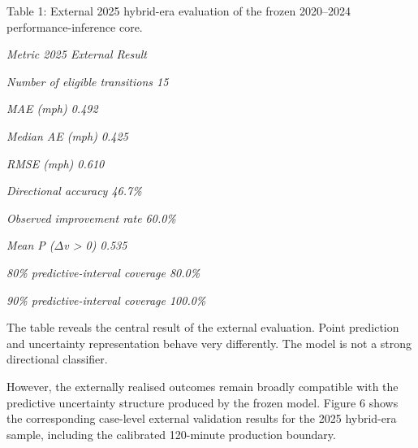 Table 1: External 2025 hybrid-era evaluation of the frozen 2020--2024 performance-inference core.

\begin{center}\textit{Metric                               2025 External Result}\end{center}

\begin{center}\textit{Number of eligible transitions                15}\end{center}

\begin{center}\textit{MAE (mph)                                   0.492}\end{center}

\begin{center}\textit{Median AE (mph)                             0.425}\end{center}

\begin{center}\textit{RMSE (mph)                                  0.610}\end{center}

\begin{center}\textit{Directional accuracy                        46.7\%}\end{center}

\begin{center}\textit{Observed improvement rate                   60.0\%}\end{center}

\begin{center}\textit{Mean P (\ensuremath{\Delta}v > 0)                             0.535}\end{center}

\begin{center}\textit{80\% predictive-interval coverage            80.0\%}\end{center}

\begin{center}\textit{90\% predictive-interval coverage           100.0\%}\end{center}

The table reveals the central result of the external evaluation. Point prediction and uncertainty representation behave very differently. The model is not a strong directional classifier.

However, the externally realised outcomes remain broadly compatible with the predictive uncertainty structure produced by the frozen model. Figure 6 shows the corresponding case-level external validation results for the 2025 hybrid-era sample, including the calibrated 120-minute production boundary.

